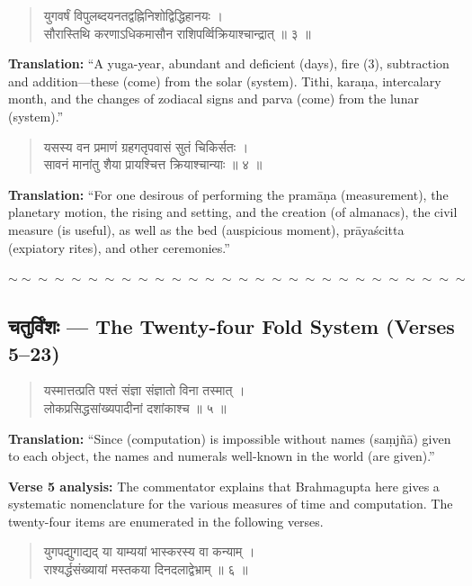 \documentclass[11pt,a4paper]{article}
\newcommand{\dev}[1]{{\devanagarifont #1}}
\newenvironment{shloka}
  {\begin{verse}\devanagarifont\color{versecolor}}
  {\end{verse}}
\newenvironment{commentary}
  {\small\color{commentarycolor}\par\noindent\ignorespaces}
  {\par}
\newcommand{\wavydivider}{\begin{center}$\sim\sim\sim\sim\sim\sim\sim\sim\sim\sim\sim\sim\sim\sim\sim\sim\sim\sim\sim\sim\sim\sim\sim\sim\sim\sim\sim\sim$\end{center}}
\begin{document}
\begin{shloka}
\dev{युगवर्षं विपुलब्दयनतद्वह्निनिशोद्विद्धिहानयः ।}\\
\dev{सौरास्तिथि करणाऽधिकमासौन राशिपर्व्विक्रियाश्चान्द्रात् ॥ ३ ॥}
\end{shloka}

\textbf{Translation:} ``A yuga-year, abundant and deficient (days), fire (3), subtraction and addition---these (come) from the solar (system). Tithi, karaṇa, intercalary month, and the changes of zodiacal signs and parva (come) from the lunar (system).''

\begin{shloka}
\dev{यसस्य वन प्रमाणं ग्रहगतृपवासं सुतं चिकिर्सतः ।}\\
\dev{सावनं मानांतु शैया प्रायश्चित्त क्रियाश्चान्याः ॥ ४ ॥}
\end{shloka}

\textbf{Translation:} ``For one desirous of performing the pramāṇa (measurement), the planetary motion, the rising and setting, and the creation (of almanacs), the civil measure (is useful), as well as the bed (auspicious moment), prāyaścitta (expiatory rites), and other ceremonies.''

\wavydivider

\subsection*{\dev{चतुर्विंशः} --- The Twenty-four Fold System (Verses 5--23)}

\begin{shloka}
\dev{यस्मात्तत्प्रति पश्तं संज्ञा संज्ञातो विना तस्मात् ।}\\
\dev{लोकप्रसिद्धसांख्यपादीनां दशांकाश्च ॥ ५ ॥}
\end{shloka}

\textbf{Translation:} ``Since (computation) is impossible without names (saṃjñā) given to each object, the names and numerals well-known in the world (are given).''

\begin{commentary}
\textbf{Verse 5 analysis:} The commentator explains that Brahmagupta here gives a systematic nomenclature for the various measures of time and computation. The twenty-four items are enumerated in the following verses.
\end{commentary}

\begin{shloka}
\dev{युगपद्युगाद्यद् या याम्ययां भास्करस्य वा कन्याम् ।}\\
\dev{राश्यर्द्धसंख्यायां मस्तकया दिनदलाद्वेभ्राम् ॥ ६ ॥}
\end{shloka}
\end{document}

